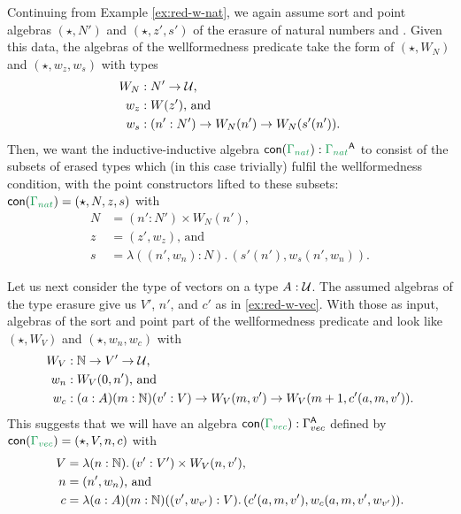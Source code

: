 \begin{defn}
\begin{example}\label{ex:red-init-nat}
Continuing from Example \ref{ex:red-w-nat}, we again assume %
sort and point algebras $(\star, N')$ and $(\star, z', s')$ of the erasure of
natural numbers  and .
Given this data,
the algebras of the wellformedness predicate take the form of
$(\star, W_N)$ and $(\star, w_z, w_s)$ with types
\begin{align*}
W_N &: N' \to \mathcal{U} \text{,} \\
w_z &: W(z') \text{, and} \\
w_s &: (n' : N') \to W_N(n') \to W_N(s'(n')) \text{.}
\end{align*}
Then, we want the inductive-inductive algebra
$\con{\Gamma_{nat}} : \grm{\Gamma_{nat}}^\CC$ to consist of the subsets of
erased types which (in this case trivially) fulfil the wellformedness condition,
with the point constructors lifted to these subsets:
$\con{\Gamma_{nat}} = (\star, N, z, s)$ with
\begin{align*}
N &= (n' : N') \times W_N(n') \text{,} \\
z &= (z', w_z) \text{, and} \\
s &= \lambda ((n', w_n) : N).\, (s'(n'), w_s(n', w_n)) \text{.}
\end{align*}
\end{example}

\begin{example}[Vectors]
Let us next consider the type of vectors on a type $A : \mathcal{U}$.
The assumed algebras of the type erasure give us $V'$, $n'$, and $c'$ as in
\ref{ex:red-w-vec}.
With those as input, algebras of the sort and point part of the 
wellformedness predicate  and
 look like
$(\star, W_V)$ and $(\star, w_n, w_c)$ with
\begin{align*}
W_V &: \mathbb{N} \to V' \to \mathcal{U} \text{,} \\
w_n &: W_V(0, n') \text{, and} \\
w_c &: (a : A)(m : \mathbb{N})(v' : V) \to W_V(m, v') \to W_V(m + 1, c'(a, m, v')) \text{.}
\end{align*}
This suggests that we will have an algebra $\con{\Gamma_{vec}} : \Gamma_{vec}^\CC$
defined by $\con{\Gamma_{vec}} = (\star, V, n, c)$ with
\begin{align*}
V &= \lambda (n : \mathbb{N}).\, (v' : V') \times W_V(n, v') \text{,} \\
n &= (n', w_n) \text{, and} \\
c &= \lambda (a : A)(m : \mathbb{N})((v', w_{v'}) : V).\, (c'(a, m, v'), w_c(a, m, v', w_{v'})) \text{.}
\end{align*}
\end{example}


\end{defn}
